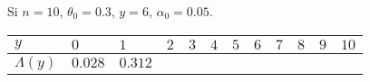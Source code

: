\documentclass[
  12pt,
]{book}
\begin{document}
Si \(n=10\), \(\theta_0 = 0.3\), \(y = 6\), \(\alpha_0=0.05\).

\begin{longtable}[]{@{}llllllllllll@{}}
\toprule
\begin{minipage}[b]{0.03\columnwidth}\raggedright
\(y\)\strut
\end{minipage} & \begin{minipage}[b]{0.06\columnwidth}\raggedright
\(0\)\strut
\end{minipage} & \begin{minipage}[b]{0.06\columnwidth}\raggedright
\(1\)\strut
\end{minipage} & \begin{minipage}[b]{0.06\columnwidth}\raggedright
\(2\)\strut
\end{minipage} & \begin{minipage}[b]{0.06\columnwidth}\raggedright
\(3\)\strut
\end{minipage} & \begin{minipage}[b]{0.06\columnwidth}\raggedright
\(4\)\strut
\end{minipage} & \begin{minipage}[b]{0.06\columnwidth}\raggedright
\(5\)\strut
\end{minipage} & \begin{minipage}[b]{0.06\columnwidth}\raggedright
\(6\)\strut
\end{minipage} & \begin{minipage}[b]{0.06\columnwidth}\raggedright
\(7\)\strut
\end{minipage} & \begin{minipage}[b]{0.06\columnwidth}\raggedright
\(8\)\strut
\end{minipage} & \begin{minipage}[b]{0.05\columnwidth}\raggedright
\(9\)\strut
\end{minipage} & \begin{minipage}[b]{0.05\columnwidth}\raggedright
\(10\)\strut
\end{minipage}\tabularnewline
\midrule
\endhead
\begin{minipage}[t]{0.03\columnwidth}\raggedright
\(\Lambda(y)\)\strut
\end{minipage} & \begin{minipage}[t]{0.06\columnwidth}\raggedright
\(0.028\)\strut
\end{minipage} & \begin{minipage}[t]{0.06\columnwidth}\raggedright
\(0.312\)\strut
\end{minipage} & \begin{minipage}[t]{0.06\columnwidth}\raggedright

\end{minipage}
\end{longtable}
\end{document}
